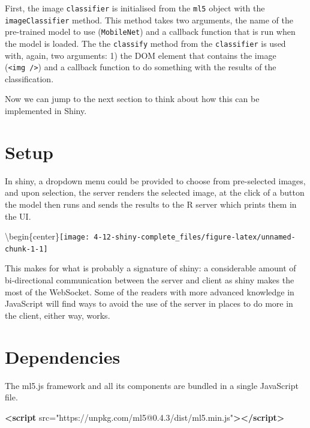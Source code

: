 \documentclass[
]{krantz}
\makeatletter
\newenvironment{Shaded}{\begin{snugshade}}{\end{snugshade}}
\newcommand{\KeywordTok}[1]{\textcolor[rgb]{0.27,0.27,0.27}{\textbf{#1}}}
\newcommand{\OtherTok}[1]{\textcolor[rgb]{0.37,0.37,0.37}{#1}}
\newcommand{\StringTok}[1]{\textcolor[rgb]{0.5,0.5,0.5}{#1}}
\newenvironment{kframe}{%
\medskip{}
\setlength{\fboxsep}{.8em}
 \def\at@end@of@kframe{}%
 \ifinner\ifhmode%
  \def\at@end@of@kframe{\end{minipage}}%
  \begin{minipage}{\columnwidth}%
 \fi\fi%
 \def\FrameCommand##1{\hskip\@totalleftmargin \hskip-\fboxsep
 \colorbox{shadecolor}{##1}\hskip-\fboxsep
     \hskip-\linewidth \hskip-\@totalleftmargin \hskip\columnwidth}%
 \MakeFramed {\advance\hsize-\width
   \@totalleftmargin\z@ \linewidth\hsize
   \@setminipage}}%
 {\par\unskip\endMakeFramed%
 \at@end@of@kframe}
\renewenvironment{Shaded}{\begin{kframe}}{\end{kframe}}
\makeatother
\begin{document}
First, the image \texttt{classifier} is initialised from the \texttt{ml5} object with the \texttt{imageClassifier} method. This method takes two arguments, the name of the pre-trained model to use (\texttt{MobileNet}) and a callback function that is run when the model is loaded. The the \texttt{classify} method from the \texttt{classifier} is used with, again, two arguments: 1) the DOM element that contains the image (\texttt{\textless{}img\ /\textgreater{}}) and a callback function to do something with the results of the classification.

Now we can jump to the next section to think about how this can be implemented in Shiny.

\hypertarget{shiny-complete-setup}{%
\section{Setup}\label{shiny-complete-setup}}

In shiny, a dropdown menu could be provided to choose from pre-selected images, and upon selection, the server renders the selected image, at the click of a button the model then runs and sends the results to the R server which prints them in the UI.

\textbackslash begin\{center\}\texttt{[image: 4-12-shiny-complete\_files/figure-latex/unnamed-chunk-1-1]}

This makes for what is probably a signature of shiny: a considerable amount of bi-directional communication between the server and client as shiny makes the most of the WebSocket. Some of the readers with more advanced knowledge in JavaScript will find ways to avoid the use of the server in places to do more in the client, either way, works.

\hypertarget{shiny-complete-dependencies}{%
\section{Dependencies}\label{shiny-complete-dependencies}}

The ml5.js framework and all its components are bundled in a single JavaScript file.

\begin{Shaded}
\begin{Highlighting}[]
\KeywordTok{<script}\OtherTok{ src=}\StringTok{"https://unpkg.com/ml5@0.4.3/dist/ml5.min.js"}\KeywordTok{></script>}
\end{Highlighting}
\end{Shaded}
\end{document}
